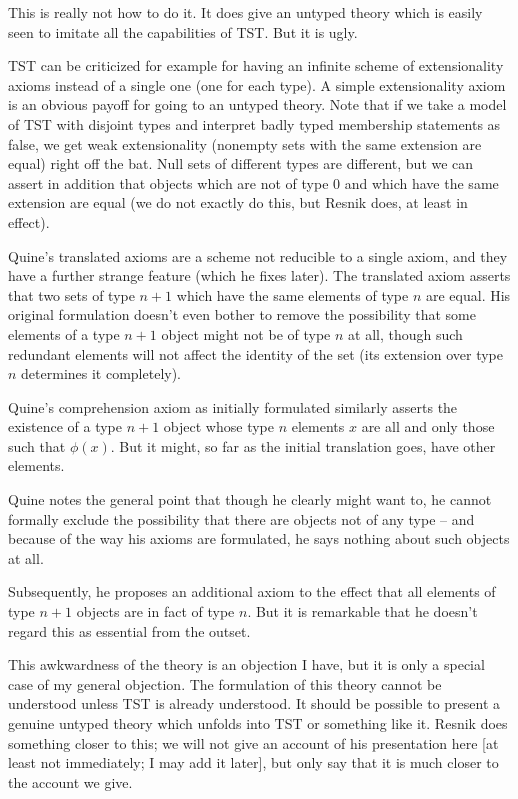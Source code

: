 \documentclass{slides}
\begin{document}
\begin{slide}

This is really not how to do it.  It does give an untyped theory which is easily seen to imitate all the capabilities of TST.  But it is ugly.

TST can be criticized for example for having an infinite scheme of extensionality axioms instead of a single one (one for each type).  A simple extensionality axiom is an obvious payoff for going to an untyped theory.  Note that if we take a model of TST with disjoint types and interpret badly typed membership statements
as false, we get weak extensionality (nonempty sets with the same extension are equal) right off the bat.  Null sets of different types are different, but we can assert in addition that objects which are not of type 0 and which have the same extension are equal (we do not exactly do this, but Resnik does, at least in effect).

\end{slide}

\begin{slide}

Quine's translated axioms are a scheme not reducible to a single axiom, and they have a further strange feature (which he fixes later).  The translated axiom asserts that two sets of type $n+1$ which have the same elements of type $n$ are equal.  His original formulation doesn't even bother to remove the possibility that
some elements of a type $n+1$ object might not be of type $n$ at all, though such redundant elements will not affect the identity of the set (its extension over type $n$ determines it completely).

Quine's comprehension axiom as initially formulated similarly asserts the existence of a type $n+1$ object whose type $n$ elements $x$ are all and only those such that $\phi(x)$.  But it might, so far as the initial translation goes, have other elements.

\end{slide}

\begin{slide}

Quine notes the general point that though he clearly might want to, he cannot formally exclude the possibility that there are objects not of any type -- and because of the way his axioms are formulated, he says nothing about such objects at all.

Subsequently, he proposes an additional axiom to the effect that all elements of type $n+1$ objects are in fact of type $n$.  But it is remarkable that he doesn't regard this as essential from the outset.

This awkwardness of the theory is an objection I have, but it is only a special case of my general objection.  The formulation of this theory cannot be understood unless TST is already understood.  It should be possible to present
a genuine untyped theory which unfolds into TST or something like it.  Resnik does something closer to this;  we will not give an account of his presentation here [at least not immediately;  I may add it later], but only say that it is much closer to the account we give.


\end{slide}
\end{document}
